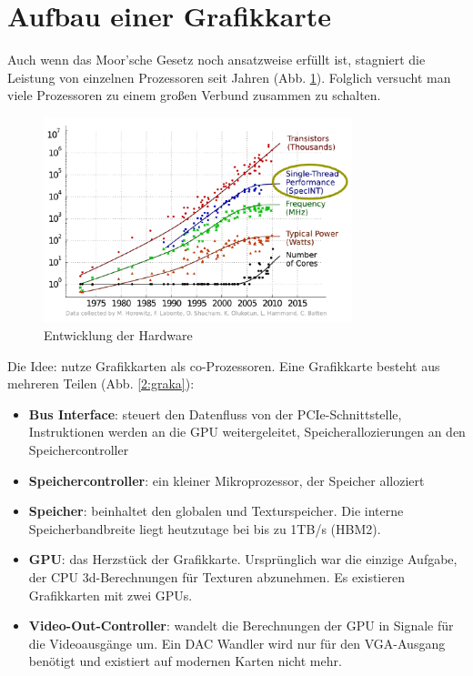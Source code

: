         \section{Aufbau einer Grafikkarte}
        Auch wenn das Moor'sche Gesetz noch ansatzweise erfüllt ist, stagniert die Leistung von einzelnen Prozessoren seit Jahren (Abb. \ref{2:hard}). Folglich versucht man viele Prozessoren zu einem großen Verbund zusammen zu schalten.
        
        \begin{figure}[h]
			\centering
    		    \includegraphics[width=0.8\textwidth]{chapter2/pictures/perf.pdf}
    		    \caption[Hardware]{Entwicklung der Hardware}
    		    \label{2:hard}
		\end{figure}
		
		\newpage

		Die Idee: nutze Grafikkarten als co-Prozessoren. Eine Grafikkarte besteht aus mehreren Teilen (Abb. \ref{2:graka}):
		\begin{itemize}
			\item \textbf{Bus Interface}: steuert den Datenfluss von der \Gls{PCIe}-Schnittstelle, Instruktionen werden an die GPU weitergeleitet, Speicherallozierungen an den Speichercontroller
			\item \textbf{Speichercontroller}: ein kleiner Mikroprozessor, der Speicher alloziert
			\item \textbf{Speicher}: beinhaltet den globalen und Texturspeicher. Die interne Speicherbandbreite liegt heutzutage bei bis zu 1TB/s (HBM2).
			\item \textbf{GPU}: das Herzstück der Grafikkarte. Ursprünglich war die einzige Aufgabe, der CPU 3d-Berechnungen für Texturen abzunehmen. Es existieren Grafikkarten mit zwei GPUs.
			\item \textbf{Video-Out-Controller}: wandelt die Berechnungen der GPU in Signale für die Videoausgänge um. Ein DAC Wandler wird nur für den VGA-Ausgang benötigt und existiert auf modernen Karten nicht mehr. 			
		\end{itemize}
		
